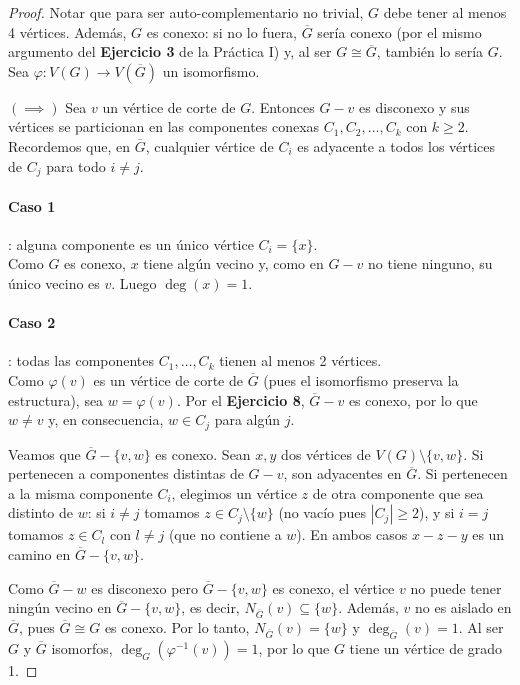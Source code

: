 \begin{proof}
    Notar que para ser auto-complementario no trivial, \( G \) debe tener al menos 4 vértices. Además, \( G \) es conexo: si no lo fuera, \( \overline{G} \) sería conexo (por el mismo argumento del \textbf{Ejercicio 3} de la Práctica I) y, al ser \( G \cong \overline{G} \), también lo sería \( G \). Sea \( \varphi : V(G) \to V(\overline{G}) \) un isomorfismo.

    \( (\implies) \) Sea \( v \) un vértice de corte de \( G \). Entonces \( G - v \) es disconexo y sus vértices se particionan en las componentes conexas \( C_1, C_2, \dots, C_k \) con \( k \ge 2 \). Recordemos que, en \( \overline{G} \), cualquier vértice de \( C_i \) es adyacente a todos los vértices de \( C_j \) para todo \( i \neq j \).

    \paragraph{Caso 1}: alguna componente es un único vértice \( C_i = \{ x \} \). \\
    Como \( G \) es conexo, \( x \) tiene algún vecino y, como en \( G - v \) no tiene ninguno, su único vecino es \( v \). Luego \( \deg(x) = 1 \).

    \paragraph{Caso 2}: todas las componentes \( C_1, \ldots, C_k \) tienen al menos 2 vértices. \\
    Como \( \varphi(v) \) es un vértice de corte de \( \overline{G} \) (pues el isomorfismo preserva la estructura), sea \( w = \varphi(v) \). Por el \textbf{Ejercicio 8}, \( \overline{G} - v \) es conexo, por lo que \( w \neq v \) y, en consecuencia, \( w \in C_j \) para algún \( j \).

    Veamos que \( \overline{G} - \{v, w\} \) es conexo. Sean \( x, y \) dos vértices de \( V(G) \setminus \{v, w\} \). Si pertenecen a componentes distintas de \( G - v \), son adyacentes en \( \overline{G} \). Si pertenecen a la misma componente \( C_i \), elegimos un vértice \( z \) de otra componente que sea distinto de \( w \): si \( i \neq j \) tomamos \( z \in C_j \setminus \{w\} \) (no vacío pues \( |C_j| \geq 2 \)), y si \( i = j \) tomamos \( z \in C_l \) con \( l \neq j \) (que no contiene a \( w \)). En ambos casos \( x - z - y \) es un camino en \( \overline{G} - \{v, w\} \).

    Como \( \overline{G} - w \) es disconexo pero \( \overline{G} - \{v, w\} \) es conexo, el vértice \( v \) no puede tener ningún vecino en \( \overline{G} - \{v, w\} \), es decir, \( N_{\overline{G}}(v) \subseteq \{ w \} \). Además, \( v \) no es aislado en \( \overline{G} \), pues \( \overline{G} \cong G \) es conexo. Por lo tanto, \( N_{\overline{G}}(v) = \{ w \} \) y \( \deg_{\overline{G}}(v) = 1 \). Al ser \( G \) y \( \overline{G} \) isomorfos, \( \deg_G(\varphi^{-1}(v)) = 1 \), por lo que \( G \) tiene un vértice de grado 1.


\end{proof}
